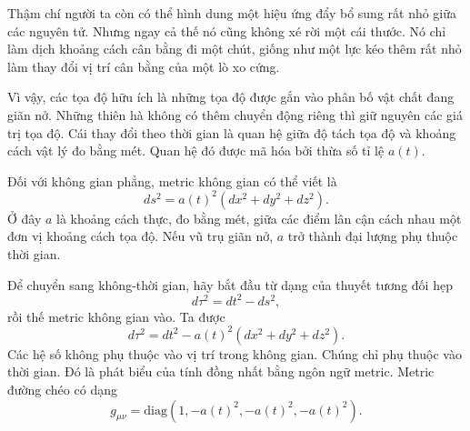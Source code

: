 \begin{classroomqa}
\end{classroomqa}

Thậm chí người ta còn có thể hình dung một hiệu ứng đẩy bổ sung rất nhỏ giữa các nguyên tử. Nhưng ngay cả thế nó cũng không xé rời một cái thước. Nó chỉ làm dịch khoảng cách cân bằng đi một chút, giống như một lực kéo thêm rất nhỏ làm thay đổi vị trí cân bằng của một lò xo cứng.

\begin{classroomqa}
\end{classroomqa}

Vì vậy, các tọa độ hữu ích là những tọa độ được gắn vào phân bố vật chất đang giãn nở. Những thiên hà không có thêm chuyển động riêng thì giữ nguyên các giá trị tọa độ. Cái thay đổi theo thời gian là quan hệ giữa độ tách tọa độ và khoảng cách vật lý đo bằng mét. Quan hệ đó được mã hóa bởi thừa số tỉ lệ \(a(t)\).

Đối với không gian phẳng, metric không gian có thể viết là
\begin{equation}
ds^2 = a(t)^2\left(dx^2+dy^2+dz^2\right).
\end{equation}
Ở đây \(a\) là khoảng cách thực, đo bằng mét, giữa các điểm lân cận cách nhau một đơn vị khoảng cách tọa độ. Nếu vũ trụ giãn nở, \(a\) trở thành đại lượng phụ thuộc thời gian.

Để chuyển sang không-thời gian, hãy bắt đầu từ dạng của thuyết tương đối hẹp
\begin{equation}
d\tau^2 = dt^2 - ds^2,
\end{equation}
rồi thế metric không gian vào. Ta được
\begin{equation}
d\tau^2 = dt^2 - a(t)^2\left(dx^2+dy^2+dz^2\right).
\end{equation}
Các hệ số không phụ thuộc vào vị trí trong không gian. Chúng chỉ phụ thuộc vào thời gian. Đó là phát biểu của tính đồng nhất bằng ngôn ngữ metric. Metric đường chéo có dạng
\begin{equation}
g_{\mu\nu}=\mathrm{diag}\!\left(1,-a(t)^2,-a(t)^2,-a(t)^2\right).
\end{equation}


